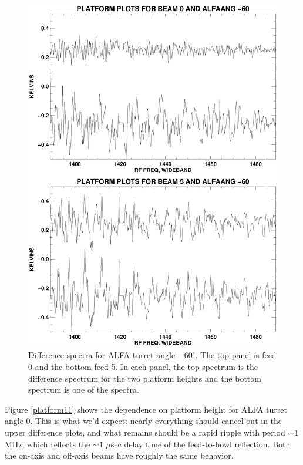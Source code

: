 \documentclass[psfig,preprint]{aastex}
\begin{document}
\begin{figure}[!p]
\begin{center}
\includegraphics[width=6in]{platform9.ps}   
\end{center}
\caption{Difference spectra for ALFA turret angle $-60^\circ$. 
The top panel is feed 0 and the bottom feed 5. In each panel,
the top spectrum is the difference spectrum for the two platform heights
and the bottom spectrum is one of the spectra. \label{platform9}}
\end{figure}

	Figure \ref{platform11} shows the dependence on platform height
for ALFA turret angle 0. This is what we'd expect: nearly everything
should cancel out in the upper difference plots, and what remains
should be a rapid ripple with period $\sim 1$ MHz, which reflects the
$\sim 1$ $\mu$sec delay time of the feed-to-bowl reflection. Both the
on-axis and off-axis beams have roughly the same behavior.
\end{document}
